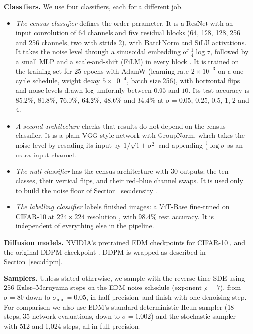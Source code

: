 \documentclass[11pt]{article}
\newcommand{\para}[1]{\textbf{#1}\hspace{0.6em}}
\begin{document}
\para{Classifiers.}
We use four classifiers, each for a different job.
\begin{itemize}[leftmargin=*]
\item \emph{The census classifier} defines the order parameter. It is a ResNet with an input convolution of 64 channels and five residual blocks (64, 128, 128, 256 and 256 channels, two with stride 2), with BatchNorm and SiLU activations. It takes the noise level through a sinusoidal embedding of $\frac14\log\sigma$, followed by a small MLP and a scale-and-shift (FiLM) in every block \citep{perez2018film}. It is trained on the training set for 25 epochs with AdamW (learning rate $2\times10^{-3}$ on a one-cycle schedule, weight decay $5\times10^{-4}$, batch size 256), with horizontal flips and noise levels drawn log-uniformly between $0.05$ and $10$. Its test accuracy is 85.2\%, 81.8\%, 76.0\%, 64.2\%, 48.6\% and 34.4\% at $\sigma=0.05$, $0.25$, $0.5$, $1$, $2$ and $4$.
\item \emph{A second architecture} checks that results do not depend on the census classifier. It is a plain VGG-style network with GroupNorm, which takes the noise level by rescaling its input by $1/\sqrt{1+\sigma^2}$ and appending $\frac14\log\sigma$ as an extra input channel.
\item \emph{The null classifier} has the census architecture with 30 outputs: the ten classes, their vertical flips, and their red--blue channel swaps. It is used only to build the noise floor of Section~\ref{sec:density}.
\item \emph{The labelling classifier} labels finished images: a ViT-Base fine-tuned on CIFAR-10 at $224\times224$ resolution \citep{dosovitskiy2021image}, with 98.4\% test accuracy. It is independent of everything else in the pipeline.
\end{itemize}

\para{Diffusion models.}
NVIDIA's pretrained EDM checkpoints for CIFAR-10 \citep[unconditional and class-conditional, VP preconditioning, 56M parameters;][]{karras2022elucidating}, and the original DDPM checkpoint \citep{ho2020denoising}. DDPM is wrapped as described in Section~\ref{sec:ddpm}.

\para{Samplers.}
Unless stated otherwise, we sample with the reverse-time SDE using 256 Euler--Maruyama steps on the EDM noise schedule (exponent $\rho=7$), from $\sigma=80$ down to $\sigma_{\min}=0.05$, in half precision, and finish with one denoising step. For comparison we also use EDM's standard deterministic Heun sampler (18 steps, 35 network evaluations, down to $\sigma=0.002$) and the stochastic sampler with 512 and 1{,}024 steps, all in full precision.
\end{document}
